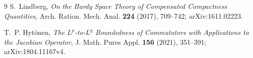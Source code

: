 \documentclass[11pt]{article}
\begin{document}
\begin{thebibliography}{9}
S.~Lindberg,
\emph{On the Hardy Space Theory of Compensated Compactness Quantities},
Arch. Ration. Mech. Anal. \textbf{224} (2017), 709--742;
arXiv:1611.02223.

T.~P. Hyt\"onen,
\emph{The $L^p$-to-$L^q$ Boundedness of Commutators with Applications to the
Jacobian Operator},
J. Math. Pures Appl. \textbf{156} (2021), 351--391;
arXiv:1804.11167v4.
\end{thebibliography}
\end{document}
